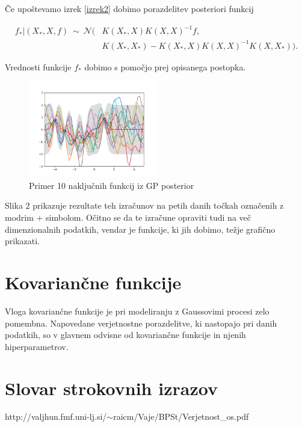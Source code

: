 \documentclass[12pt,a4paper]{amsart}
\theoremstyle{definition} %
\theoremstyle{plain} %
\newcommand{\geslo}[2]{\noindent\textbf{#1}\hspace*{3mm}\hangindent=\parindent\hangafter=1 #2}
\begin{document}
Če upoštevamo izrek \ref{izrek2} dobimo porazdelitev posteriori funkcij

\begin{equation}
\begin{split}
f_{*} |( X_{*}, X, f ) ~ \sim ~ \mathcal{N} ( &K(X_{*},X) K(X,X)^{-1} f, \\
& K(X_{*},X_{*}) - K(X_{*},X)K(X,X)^{-1}K(X,X_{*})).
\end{split}
\end{equation}

Vrednosti funkcije $f_{*}$ dobimo s pomočjo prej opisanega postopka. 

\begin{figure}[h]
\caption{Primer 10 naključnih funkcij iz GP posterior}
\centering
\includegraphics[width=0.5\textwidth]{10posterior}
\end{figure}

\opomba Slika 2 prikazuje rezultate teh izračunov na petih danih točkah označenih z modrim + simbolom. 
Očitno se da te izračune opraviti tudi na več dimenzionalnih podatkih, vendar je funkcije, ki jih dobimo, težje grafično prikazati.


\section{Kovariančne funkcije}
Vloga kovariančne funkcije je pri modeliranju z Gaussovimi procesi zelo pomembna. Napovedane verjetnostne porazdelitve, ki nastopajo pri danih podatkih, so v glavnem odvisne od kovariančne funkcije in njenih hiperparametrov.
\section*{Slovar strokovnih izrazov}

%
%


\begin{thebibliography}{99}

\bibitem{}http://valjhun.fmf.uni-lj.si/$\sim$raicm/Vaje/BPSt/Verjetnost\_os.pdf

\end{thebibliography}
\end{document}
